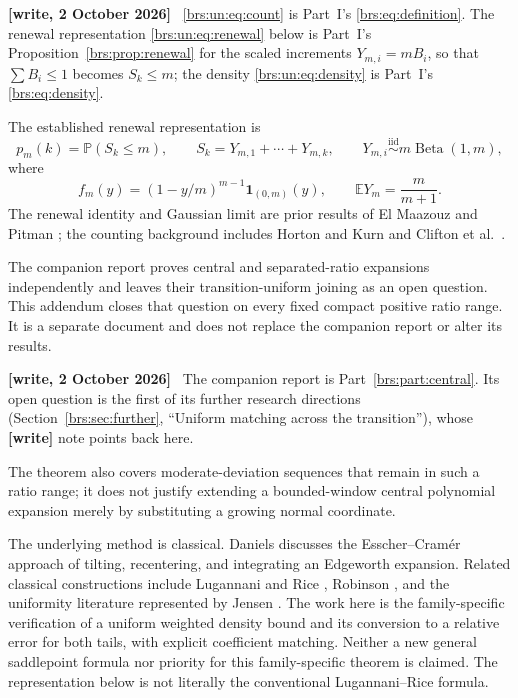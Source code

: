 \documentclass[11pt]{article}
\numberwithin{equation}{section}
\theoremstyle{remark}\newtheorem{remark}[theorem]{Remark}
\newcommand{\Prob}{\mathbb P}\newcommand{\E}{\mathbb E}\newcommand{\He}{\operatorname{He}}
\newenvironment{writenote}{\par\smallskip\begingroup\small\noindent\textbf{[write, 2 October 2026]}\ }{\par\endgroup\smallskip}
\begin{document}
\begin{writenote}
\eqref{brs:un:eq:count} is Part~I's \eqref{brs:eq:definition}. The renewal representation \eqref{brs:un:eq:renewal} below is Part~I's Proposition~\ref{brs:prop:renewal} for the scaled increments $Y_{m,i}=mB_i$, so that $\sum B_i\le1$ becomes $S_k\le m$; the density \eqref{brs:un:eq:density} is Part~I's \eqref{brs:eq:density}.
\end{writenote}
The established renewal representation is
\begin{equation}\label{brs:un:eq:renewal}
 p_m(k)=\Prob(S_k\le m),\qquad
 S_k=Y_{m,1}+\cdots+Y_{m,k},\qquad
 Y_{m,i}\overset{\mathrm{iid}}\sim m\operatorname{Beta}(1,m),
\end{equation}
where
\begin{equation}\label{brs:un:eq:density}
 f_m(y)=(1-y/m)^{m-1}\mathbf1_{(0,m)}(y),\qquad
 \E Y_m=\frac{m}{m+1}.
\end{equation}
The renewal identity and Gaussian limit are prior results of
El Maazouz and Pitman \cite{clock}; the counting background includes
Horton and Kurn \cite{horton} and Clifton et al.\ \cite{clifton}.

The companion report \cite{base} proves central and separated-ratio
expansions independently and leaves their transition-uniform joining as
an open question.  This addendum closes that question on every fixed
compact positive ratio range.  It is a separate document and does not
replace the companion report or alter its results.
\begin{writenote}
The companion report \cite{base} is Part~\ref{brs:part:central}. Its open question is the first of its further research directions (Section~\ref{brs:sec:further}, ``Uniform matching across the transition''), whose \textbf{[write]} note points back here.
\end{writenote}
  The theorem also
covers moderate-deviation sequences that remain in such a ratio range;
it does not justify extending a bounded-window central polynomial
expansion merely by substituting a growing normal coordinate.

The underlying method is classical.  Daniels \cite{daniels} discusses
the Esscher--Cram\'er approach of tilting, recentering, and integrating
an Edgeworth expansion.  Related classical constructions include
Lugannani and Rice \cite{lr}, Robinson \cite{robinson}, and the
uniformity literature represented by Jensen \cite{jensen}.
The work here is the family-specific verification of a uniform
weighted density bound and its conversion to a relative error for
both tails, with explicit coefficient matching.  Neither a new general
saddlepoint formula nor priority for this family-specific theorem is
claimed.  The representation below is not literally the conventional
Lugannani--Rice formula.
\end{document}
